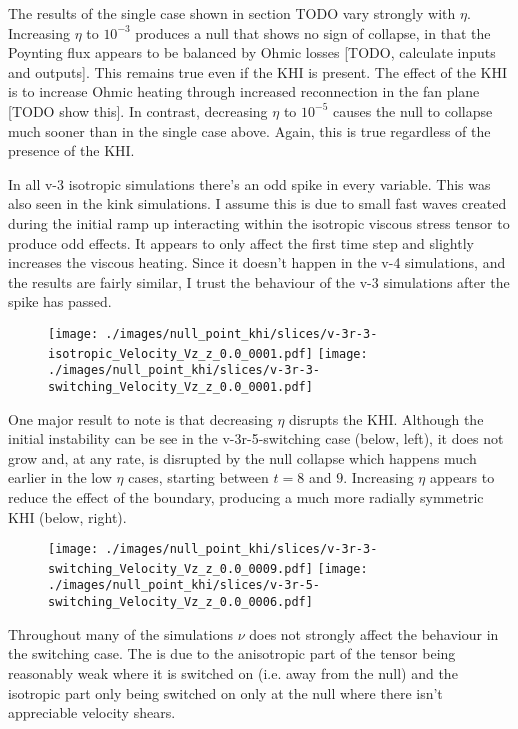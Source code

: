 The results of the single case shown in section TODO vary strongly with $\eta$. Increasing $\eta$ to $10^{-3}$ produces a null that shows no sign of collapse, in that the Poynting flux appears to be balanced by Ohmic losses [TODO, calculate inputs and outputs]. This remains true even if the KHI is present. The effect of the KHI is to increase Ohmic heating through increased reconnection in the fan plane [TODO show this]. In contrast, decreasing $\eta$ to $10^{-5}$ causes the null to collapse much sooner than in the single case above. Again, this is true regardless of the presence of the KHI.

In all v-3 isotropic simulations there's an odd spike in every variable. This was also seen in the kink simulations. I assume this is due to small fast waves created during the initial ramp up interacting within the isotropic viscous stress tensor to produce odd effects. It appears to only affect the first time step and slightly increases the viscous heating. Since it doesn't happen in the v-4 simulations, and the results are fairly similar, I trust the behaviour of the v-3 simulations after the spike has passed.

\begin{figure}[H]
  \centering
  \texttt{[image: ./images/null\_point\_khi/slices/v-3r-3-isotropic\_Velocity\_Vz\_z\_0.0\_0001.pdf]}
  \texttt{[image: ./images/null\_point\_khi/slices/v-3r-3-switching\_Velocity\_Vz\_z\_0.0\_0001.pdf]}
\end{figure}

One major result to note is that decreasing $\eta$ disrupts the KHI. Although the initial instability can be see in the v-3r-5-switching case (below, left), it does not grow and, at any rate, is disrupted by the null collapse which happens much earlier in the low $\eta$ cases, starting between $t=8$ and $9$. Increasing $\eta$ appears to reduce the effect of the boundary, producing a much more radially symmetric KHI (below, right).

\begin{figure}[H]
  \centering
  \texttt{[image: ./images/null\_point\_khi/slices/v-3r-3-switching\_Velocity\_Vz\_z\_0.0\_0009.pdf]}
  \texttt{[image: ./images/null\_point\_khi/slices/v-3r-5-switching\_Velocity\_Vz\_z\_0.0\_0006.pdf]}
\end{figure}

Throughout many of the simulations $\nu$ does not strongly affect the behaviour in the switching case. The is due to the anisotropic part of the tensor being reasonably weak where it is switched on (i.e. away from the null) and the isotropic part only being switched on only at the null where there isn't appreciable velocity shears.

